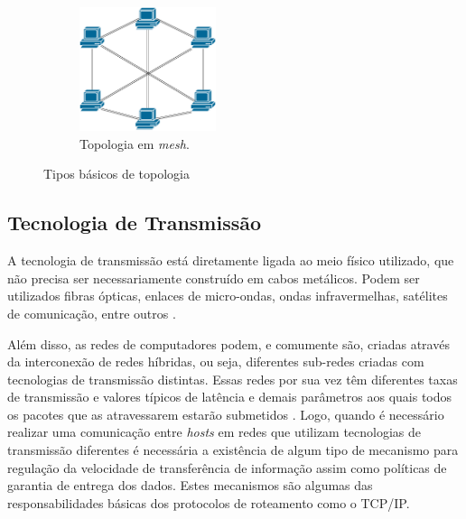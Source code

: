 \begin{figure}[t!]
\begin{subfigure}[t]{0.4\textwidth}
	\end{subfigure}
	~
	\begin{subfigure}[t]{0.4\textwidth}
		\centering
		\includegraphics[width=4cm]{./figuras/Topologia-Mesh.pdf} %
	\caption{Topologia em \emph{mesh}.}
	\label{fig_topologia_multiplo_mesh}
	\end{subfigure}
	\caption{Tipos básicos de topologia}
	\label{fig_topologia_multiplo}
\end{figure}

\subsection{Tecnologia de Transmissão}
A tecnologia de transmissão está diretamente ligada ao meio físico utilizado, que não precisa ser necessariamente construído em cabos metálicos. Podem ser utilizados fibras ópticas, enlaces de micro-ondas, ondas infravermelhas, satélites de comunicação, entre outros \cite{Book-Tanenbaum2003}. 

Além disso, as redes de computadores podem, e comumente são, criadas através da interconexão de redes híbridas, ou seja, diferentes sub-redes criadas com tecnologias de transmissão distintas. Essas redes por sua vez têm diferentes taxas de transmissão e valores típicos de latência e demais parâmetros aos quais todos os pacotes que as atravessarem estarão submetidos \cite{Book-Kurose2013}. Logo, quando é necessário realizar uma comunicação entre \emph{hosts} em redes que utilizam tecnologias de transmissão diferentes é necessária a existência de algum tipo de mecanismo para regulação da velocidade de transferência de informação assim como políticas de garantia de entrega dos dados. Estes mecanismos são algumas das responsabilidades básicas dos protocolos de roteamento como o TCP/IP.

